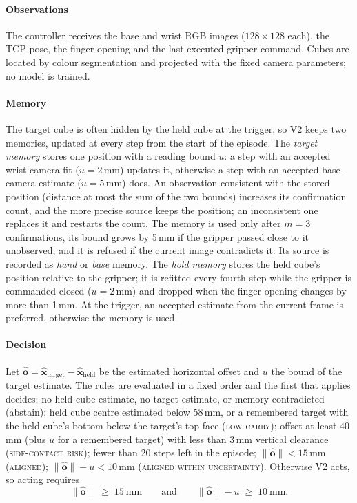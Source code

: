 \paragraph{Observations} The controller receives the base and wrist RGB images ($128\times128$ each), the TCP pose, the finger opening and the last executed gripper command. Cubes are located by colour segmentation and projected with the fixed camera parameters; no model is trained.

\paragraph{Memory} The target cube is often hidden by the held cube at the trigger, so V2 keeps two memories, updated at every step from the start of the episode. The \emph{target memory} stores one position with a reading bound $u$: a step with an accepted wrist-camera fit ($u=2$\,mm) updates it, otherwise a step with an accepted base-camera estimate ($u=5$\,mm) does. An observation consistent with the stored position (distance at most the sum of the two bounds) increases its confirmation count, and the more precise source keeps the position; an inconsistent one replaces it and restarts the count. The memory is used only after $m=3$ confirmations, its bound grows by 5\,mm if the gripper passed close to it unobserved, and it is refused if the current image contradicts it. Its source is recorded as \emph{hand} or \emph{base} memory. The \emph{hold memory} stores the held cube's position relative to the gripper; it is refitted every fourth step while the gripper is commanded closed ($u=2$\,mm) and dropped when the finger opening changes by more than 1\,mm. At the trigger, an accepted estimate from the current frame is preferred, otherwise the memory is used.

\paragraph{Decision} Let $\hat{\mathbf{o}}=\hat{\mathbf{x}}_{\mathrm{target}}-\hat{\mathbf{x}}_{\mathrm{held}}$ be the estimated horizontal offset and $u$ the bound of the target estimate. The rules are evaluated in a fixed order and the first that applies decides: no held-cube estimate, no target estimate, or memory contradicted (abstain); held cube centre estimated below 58\,mm, or a remembered target with the held cube's bottom below the target's top face (\textsc{low carry}); offset at least 40\,mm (plus $u$ for a remembered target) with less than 3\,mm vertical clearance (\textsc{side-contact risk}); fewer than 20 steps left in the episode; $\|\hat{\mathbf{o}}\|<15$\,mm (\textsc{aligned}); $\|\hat{\mathbf{o}}\|-u<10$\,mm (\textsc{aligned within uncertainty}). Otherwise V2 acts, so acting requires
\begin{equation}
\|\hat{\mathbf{o}}\| \;\ge\; 15\ \mathrm{mm} \qquad\text{and}\qquad \|\hat{\mathbf{o}}\| - u \;\ge\; 10\ \mathrm{mm}.
\end{equation}

